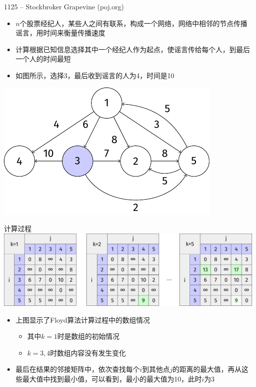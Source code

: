 \begin{frame}{1125 -- Stockbroker Grapevine (poj.org)}
    \begin{itemize}
        \item $n$个股票经纪人，某些人之间有联系，构成一个网络，网络中相邻的节点传播谣言，用时间来衡量传播速度
        \item 计算根据已知信息选择其中一个经纪人作为起点，使谣言传给每个人，到最后一个人的时间最短
        \item 如图所示，选择3，最后收到谣言的人为4，时间是10
    \end{itemize}
    \includegraphics[center]{fig/8-2.pdf}
\end{frame}
\begin{frame}{计算过程}
    \includegraphics[scale=0.5,center]{fig/8-3.pdf}
    \begin{itemize}
        \item 上图显示了Floyd算法计算过程中的数组情况
        \begin{itemize}
            \item 其中$k=1$时是数组的初始情况
            \item $k=3,4$时数组内容没有发生变化
        \end{itemize}
        \item 最后在结果的邻接矩阵中，依次查找每个$i$到其他点$j$的距离的最大值，再从这些最大值中找到最小值，可以看到，最小的最大值为10，此时$i$为3
    \end{itemize}
\end{frame}

